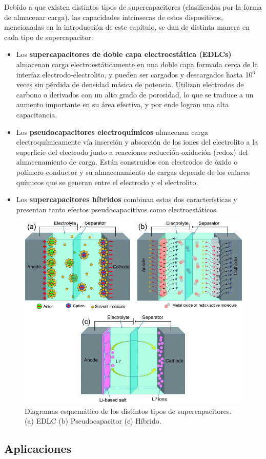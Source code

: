 Debido a que existen distintos tipos de supercapacitores (clasificados por la forma de almacenar carga), las capacidades intrínsecas de estos dispositivos, mencionadas en la introducción de este capítulo, se dan de distinta manera en cada tipo de supercapacitor:

\begin{itemize}
    \item Los \textbf{supercapacitores de doble capa electroestática (EDLCs)} almacenan carga electroestáticamente en una doble capa formada cerca de la interfaz electrodo-electrolito, y pueden ser cargados y descargados hasta 10$^6$ veces sin pérdida de densidad másica de potencia. Utilizan electrodos de carbono o derivados con un alto grado de porosidad, lo que se traduce a un aumento importante en su área efectiva, y por ende logran una alta capacitancia.
    \item Los \textbf{pseudocapacitores electroquímicos} almacenan carga electroquímicamente vía inserción y absorción de los iones del electrolito a la superficie del electrodo junto a reacciones reducción-oxidación (redox) del almacenamiento de carga. Están construidos con electrodos de óxido o polímero conductor y su almacenamiento de cargas depende de los enlaces químicos que se generan entre el electrodo y el electrolito.
    \item Los \textbf{supercapacitores híbridos} combinan estas dos características y presentan tanto efectos pseudocapacitivos como electroestáticos.
\end{itemize}

\begin{figure}[hbt!]
  \centering
  \includegraphics[width=0.50\columnwidth]{Imágenes/Diagrama esquemático de supercapacitores.png}
  \caption{Diagramas esquemático de los distintos tipos de supercapacitores. (a) EDLC (b) Pseudocapacitor (c) Híbrido.}
  \label{supercapacitores}
\end{figure} 


\subsection{Aplicaciones}


